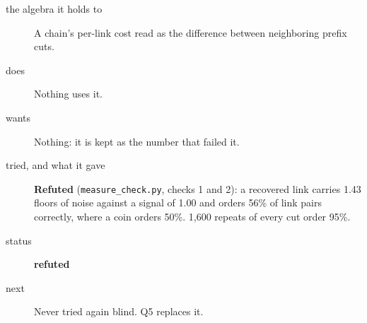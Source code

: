 \begin{description}
\item[{the algebra it holds to}] A chain's per-link cost read as the difference between neighboring prefix cuts.
\item[{does}] Nothing uses it.
\item[{wants}] Nothing: it is kept as the number that failed it.
\item[{tried, and what it gave}] \textbf{Refuted} (\texttt{measure\_\allowbreak{}check.\allowbreak{}py}, checks 1 and 2): a recovered link carries 1.43 floors of noise against a signal of 1.00 and orders 56\% of link pairs correctly, where a coin orders 50\%. 1,600 repeats of every cut order 95\%.
\item[{status}] \textbf{refuted}
\item[{next}] Never tried again blind. Q5 replaces it.
\end{description}

